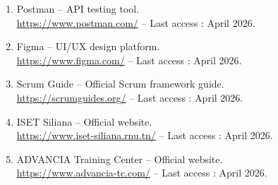\begin{enumerate}[leftmargin=2em,itemsep=0.4em]
  \item Postman -- API testing tool. \\
        \url{https://www.postman.com/} -- Last access : April 2026.
  \item Figma -- UI/UX design platform. \\
        \url{https://www.figma.com/} -- Last access : April 2026.
  \item Scrum Guide -- Official Scrum framework guide. \\
        \url{https://scrumguides.org/} -- Last access : April 2026.
  \item ISET Siliana -- Official website. \\
        \url{https://www.iset-siliana.rnu.tn/} -- Last access : April 2026.
  \item ADVANCIA Training Center -- Official website. \\
        \url{https://www.advancia-tc.com/} -- Last access : April 2026.
\end{enumerate}

\cleardoublepage
